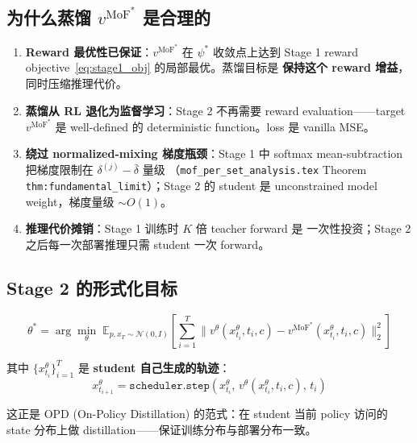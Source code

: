 \documentclass[11pt,a4paper]{article}
\newcommand{\E}{\mathbb{E}}
\newcommand{\N}{\mathcal{N}}
\newcommand{\MoF}{\mathrm{MoF}}
\theoremstyle{definition}
\begin{document}
\subsection{为什么蒸馏 $v^{\MoF^*}$ 是合理的}

\begin{enumerate}[leftmargin=1.5em]
\item \textbf{Reward 最优性已保证}：$v^{\MoF^*}$ 在 $\psi^*$ 收敛点上达到
  Stage 1 reward objective~\eqref{eq:stage1_obj} 的局部最优。蒸馏目标是
  \textbf{保持这个 reward 增益}，同时压缩推理代价。

\item \textbf{蒸馏从 RL 退化为监督学习}：Stage 2 不再需要 reward
  evaluation——target $v^{\MoF^*}$ 是 well-defined 的 deterministic
  function。loss 是 vanilla MSE。

\item \textbf{绕过 normalized-mixing 梯度瓶颈}：Stage 1 中 softmax
  mean-subtraction 把梯度限制在 $\delta^{(j)} - \bar\delta$ 量级
  （\texttt{mof\_per\_set\_analysis.tex} Theorem
  \texttt{thm:fundamental\_limit}）；Stage 2 的 student 是
  unconstrained model weight，梯度量级 $\sim O(1)$。

\item \textbf{推理代价摊销}：Stage 1 训练时 $K$ 倍 teacher forward 是
  一次性投资；Stage 2 之后每一次部署推理只需 student 一次 forward。
\end{enumerate}

\subsection{Stage 2 的形式化目标}

\begin{equation}
\theta^* = \arg\min_\theta\; \E_{p, x_T \sim \N(0, I)}\!\left[
\sum_{i=1}^T \Big\| v^\theta(x_{t_i}^\theta, t_i, c) - v^{\MoF^*}(x_{t_i}^\theta, t_i, c) \Big\|_2^2
\right]
\label{eq:stage2_obj}
\end{equation}

其中 $\{x_{t_i}^\theta\}_{i=1}^T$ 是 \textbf{student 自己生成的轨迹}：
\begin{equation}
x_{t_{i+1}}^\theta = \texttt{scheduler.step}(x_{t_i}^\theta,\, v^\theta(x_{t_i}^\theta, t_i, c),\, t_i)
\label{eq:student_traj}
\end{equation}

这正是 OPD (On-Policy Distillation) 的范式：在 student 当前 policy 访问的
state 分布上做 distillation——保证训练分布与部署分布一致。
\end{document}
